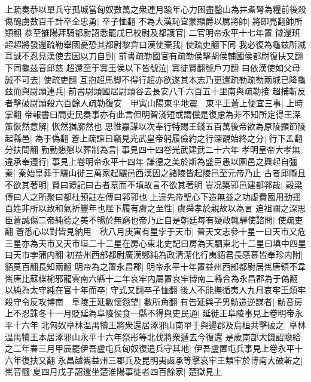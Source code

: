 上疏奏恭以單兵守孤城當匈奴數萬之衆連月踰年心力困盡鑿山為井煮弩為糧前後殺傷醜虜數百千計卒全忠勇|{
	卒子恤翻}
不為大漢恥宜蒙顯爵以厲將帥|{
	將即亮翻帥所類翻}
恭至雒陽拜騎都尉詔悉罷戊巳校尉及都護官|{
	二官明帝永平十七年置}
徵還班超超將發還疏勒舉國憂恐其都尉黎弇曰漢使棄我|{
	使疏吏翻下同}
我必復為龜兹所滅耳誠不忍見漢使去因以刀自剄|{
	前書疏勒國官有疏勒侯擊胡侯輔國侯都尉復扶又翻下同龜兹音邱慈}
超還至于窴王侯以下皆號泣|{
	窴徒賢翻號戶刀翻}
曰依漢使如父母誠不可去|{
	使疏吏翻}
互抱超馬脚不得行超亦欲遂其本志乃更還疏勒疏勒兩城已降龜兹而與尉頭連兵|{
	前書尉頭國居尉頭谷去長安八千六百五十里南與疏勒接}
超捕斬反者擊破尉頭殺六百餘人疏勒復安　甲寅山陽東平地震　東平王蒼上便宜三事|{
	上時掌翻}
帝報書曰間吏民奏事亦有此言但明智淺短或謂儻是復慮為非不知所定得王深策恢然意解|{
	恢然猶廓然也}
思惟嘉謀以次奉行特賜王錢五百萬後帝欲為原陵顯節陵起縣邑|{
	為于偽翻}
蒼上疏諫曰竊見光武皇帝躬履儉約之行深覩始終之分|{
	行下孟翻分扶問翻}
勤勤懇懇以葬制為言|{
	事見四十四卷光武建武二十六年}
孝明皇帝大孝無違承奉遵行|{
	事見上卷明帝永平十四年}
謙德之美於斯為盛臣愚以園邑之興起自彊秦|{
	秦始皇葬于驪山徙三萬家起驪邑西漢因之諸陵皆起陵邑至元帝乃止}
古者邱隴且不欲其著明|{
	賢曰禮記曰古者墓而不墳故言不欲其著明}
豈况築郭邑建都郛哉|{
	穀梁傳曰人之所聚曰都杜預註左傳曰郛郭也}
上違先帝聖心下造無益之功虚費國用動揺百姓非所以致和氣祈豐年也陛下履有虞之至性|{
	虞舜孝於親故以為言}
追祖禰之深思臣蒼誠傷二帝純德之美不暢於無窮也帝乃止自是朝廷每有疑政輒驛使諮問|{
	使疏吏翻}
蒼悉心以對皆見納用　秋八月庚寅有星孛于天市|{
	晉天文志參十星一曰天市又危三星亦為天市又天市垣二十二星在房心東北史記曰房為天駟東北十二星曰填中四星曰天市孛蒲内翻}
初益州西部都尉廣漢鄭純為政清潔化行夷貊君長感慕皆奉珍内附|{
	貊莫百翻長知兩翻}
明帝為之置永昌郡|{
	明帝永平十年置益州西部都尉居嶲唐領不韋嶲唐比蘇楪榆邪龍雲南六縣十二年哀牢内屬置哀牢博南二縣合為永昌郡為于偽翻}
以純為太守純在官十年而卒|{
	守式又翻卒子恤翻}
後人不能撫循夷人九月哀牢王類牢殺守令反攻博南　阜陵王延數懷怨望|{
	數所角翻}
有告延與子男魴造逆謀者|{
	魴音房}
上不忍誅冬十一月貶延為阜陵侯食一縣不得與吏民通|{
	延徙王阜陵事見上卷明帝永平十六年}
北匈奴臯林温禺犢王將衆還居涿邪山南單于與邊郡及烏桓共擊破之|{
	臯林温禺犢王本居涿邪山永平十六年祭彤等北伐將衆遁去今復還}
是歲南部大饑詔贍給之二年春三月甲辰罷伊吾盧屯兵匈奴復遣兵守其地|{
	伊吾盧置屯兵事見上卷永平十六年復扶又翻}
永昌越嶲益州三郡兵及昆明夷鹵承等擊哀牢王類牢於博南大破斬之|{
	嶲音髓}
夏四月戊子詔還坐楚淮陽事徙者四百餘家|{
	楚獄見上}


